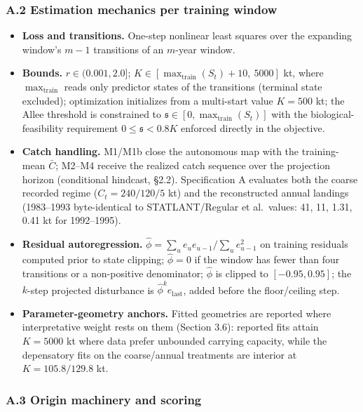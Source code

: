 \documentclass[11pt]{article}
\providecommand{\tightlist}{\setlength{\itemsep}{0.2em}\setlength{\parskip}{0pt}}
\begin{document}
\subsubsection{A.2 Estimation mechanics per training
window}\label{a.2-estimation-mechanics-per-training-window}

\begin{itemize}
\tightlist
\item
  \textbf{Loss and transitions.} One-step nonlinear least squares over
  the expanding window's \(m-1\) transitions of an \(m\)-year window.
\item
  \textbf{Bounds.} \(r \in (0.001, 2.0]\);
  \(K \in [\max_{\mathrm{train}}(S_t) + 10,\ 5000]\) kt, where
  \(\max_{\mathrm{train}}\) reads only predictor states of the
  transitions (terminal state excluded); optimization initializes from a
  multi-start value \(K = 500\) kt; the Allee threshold is constrained
  to \(\mathfrak{s} \in [0, \max_{\mathrm{train}}(S_t)]\) with the
  biological-feasibility requirement \(0 \le \mathfrak{s} < 0.8K\)
  enforced directly in the objective.
\item
  \textbf{Catch handling.} M1/M1b close the autonomous map with the
  training-mean \(\bar{C}\); M2--M4 receive the realized catch sequence
  over the projection horizon (conditional hindcast, §2.2).
  Specification A evaluates both the coarse recorded regime
  (\(C_t = 240 / 120 / 5\) kt) and the reconstructed annual landings
  (1983--1993 byte-identical to STATLANT/Regular et al.~values: 41, 11,
  1.31, 0.41 kt for 1992--1995).
\item
  \textbf{Residual autoregression.}
  \(\hat\phi = \sum_u e_u e_{u-1} \big/ \sum_u e_{u-1}^2\) on training
  residuals computed prior to state clipping; \(\hat\phi=0\) if the
  window has fewer than four transitions or a non-positive denominator;
  \(\hat\phi\) is clipped to \([-0.95, 0.95]\); the \(k\)-step projected
  disturbance is \(\hat\phi^k e_{\mathrm{last}}\), added before the
  floor/ceiling step.
\item
  \textbf{Parameter-geometry anchors.} Fitted geometries are reported
  where interpretative weight rests on them (Section 3.6): reported fits
  attain \(K = 5000\) kt where data prefer unbounded carrying capacity,
  while the depensatory fits on the coarse/annual treatments are
  interior at \(K = 105.8/129.8\) kt.
\end{itemize}

\subsubsection{A.3 Origin machinery and
scoring}\label{a.3-origin-machinery-and-scoring}
\end{document}
